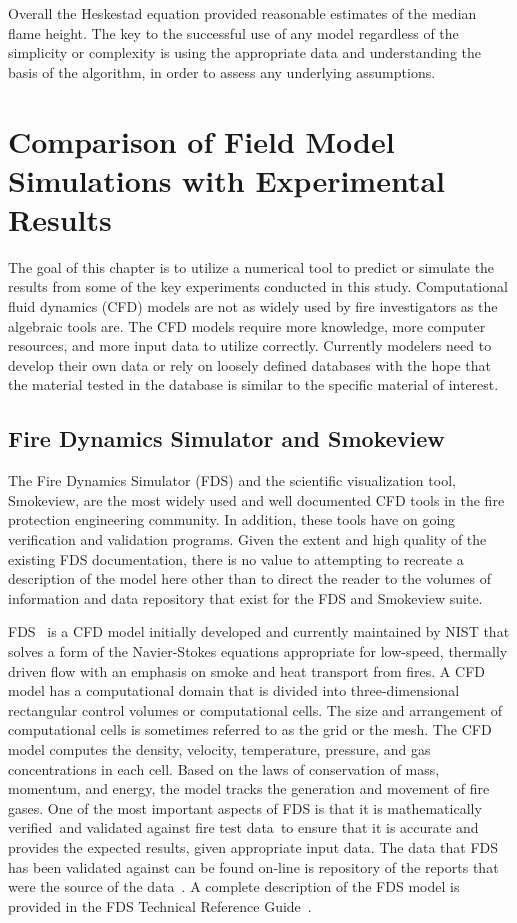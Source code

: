\documentclass[twoside]{uocthesis}
\begin{document}
{Overall the Heskestad equation provided reasonable estimates of the median flame height.  The key to the successful use of any model regardless of the simplicity or complexity is using the appropriate data and understanding the basis of the algorithm, in order to assess any underlying assumptions. 

\chapter{Comparison of Field Model Simulations with Experimental Results}

The goal of this chapter is to utilize a numerical tool to predict or simulate the results from some of the key experiments conducted in this study.  Computational fluid dynamics (CFD) models are not as widely used by fire investigators as the algebraic tools are.  The CFD models require more knowledge, more computer resources, and more input data to utilize correctly.  Currently modelers need to develop their own data or rely on loosely defined databases with the hope that the material tested in the database is similar to the specific material of interest.       

\section{Fire Dynamics Simulator and Smokeview}

The Fire Dynamics Simulator (FDS) and the scientific visualization tool, Smokeview, are the most widely used and well documented CFD tools in the fire protection engineering community. In addition, these tools have on going verification and validation programs.  Given the extent and high quality of the existing FDS documentation, there is no value to attempting to recreate a description of the model here other than to direct the reader to the volumes of information and data repository that exist for the FDS and Smokeview suite.

FDS~\cite{FDS_Users_Guide} is a CFD model initially developed and currently maintained by NIST that solves a form of the Navier-Stokes equations appropriate for low-speed, thermally driven flow with an emphasis on smoke and heat transport from fires. A CFD model has a computational domain that is divided into  three-dimensional rectangular control volumes or computational cells. The size and arrangement of computational cells is sometimes referred to as the grid or the mesh.  The CFD model computes the density, velocity, temperature, pressure, and gas concentrations in each cell. Based on the laws of conservation of mass, momentum, and energy, the model tracks the generation and movement of fire gases. One of the most important aspects of FDS is that it is mathematically verified~\cite{FDS_Verification_Guide}and validated against fire test data~\cite{FDS_Validation_Guide}to ensure that it is accurate and provides the expected results, given appropriate input data.  The data that FDS has been validated against can be found on-line is repository of the reports that were the source of the data~\cite{FDS-SMV_repository}. A complete description of the FDS model is provided in the FDS Technical Reference Guide~\cite{FDS_Tech_Guide}.  

}
\end{document}
